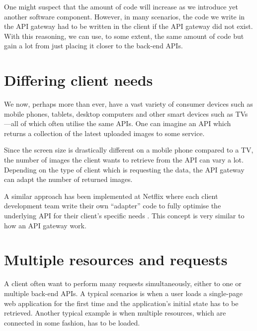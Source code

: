 \documentclass{cslthse-msc}
\begin{document}
One might suspect that the amount of code will increase as we introduce yet another software component. However, in many scenarios, the code we write in the API gateway had to be written in the client if the API gateway did not exist. With this reasoning, we can use, to some extent, the same amount of code but gain a lot from just placing it closer to the back-end APIs.

\section{Differing client needs}
We now, perhaps more than ever, have a vast variety of consumer devices such as mobile phones, tablets, desktop computers and other smart devices such as TVs---all of which often utilise the same APIs. One can imagine an API which returns a collection of the latest uploaded images to some service. 

Since the screen size is drastically different on a mobile phone compared to a TV, the number of images the client wants to retrieve from the API can vary a lot. Depending on the type of client which is requesting the data, the API gateway can adapt the number of returned images.

A similar approach has been implemented at Netflix where each client development team write their own \enquote{adapter} code to fully optimise the underlying API for their client's specific needs \cite{netflix}. This concept is very similar to how an API gateway work.

\section{Multiple resources and requests}
A client often want to perform many requests simultaneously, either to one or multiple back-end APIs. A typical scenarios is when a user loads a single-page web application for the first time and the application's initial state has to be retrieved. Another typical example is when multiple resources, which are connected in some fashion, has to be loaded.
\end{document}
